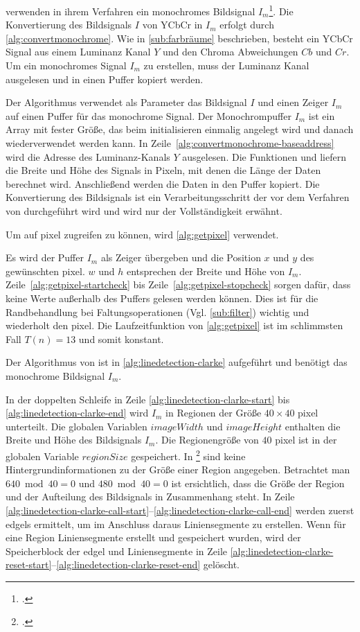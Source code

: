 \citeauthor{clarke96} verwenden in ihrem Verfahren ein monochromes Bildsignal $I_m$\footcite[Vgl.][S.~417]{clarke96}.
 Die Konvertierung des Bildsignals $I$ von YCbCr in $I_m$ erfolgt durch \autoref{alg:convertmonochrome}. Wie in
 \autoref{sub:farbräume} beschrieben, besteht ein YCbCr Signal aus einem Luminanz Kanal $Y$ und den Chroma Abweichungen
 $Cb$ und $Cr$. Um ein monochromes Signal $I_m$ zu erstellen, muss der Luminanz Kanal ausgelesen und in einen Puffer
 kopiert werden.

Der Algorithmus verwendet als Parameter das Bildsignal $I$ und einen Zeiger $I_m$ auf einen Puffer für das monochrome
 Signal. Der Monochrompuffer $I_m$ ist ein Array mit fester Größe, das beim initialisieren einmalig angelegt wird und
 danach wiederverwendet werden kann. In Zeile~\ref{alg:convertmonochrome-baseaddress} wird die Adresse des
 Luminanz-Kanals $Y$ ausgelesen. Die Funktionen  und  liefern die Breite und Höhe des
 Signals in Pixeln, mit denen die Länge der Daten berechnet wird. Anschließend werden die Daten in den Puffer kopiert.
 Die Konvertierung des Bildsignals ist ein Verarbeitungsschritt der vor dem Verfahren von \citeauthor{clarke96}
 durchgeführt wird und wird nur der Vollständigkeit erwähnt.

Um auf \gls{pixel} zugreifen zu können, wird \autoref{alg:getpixel} verwendet.

Es wird der Puffer $I_m$ als Zeiger übergeben und die Position $x$ und $y$ des gewünschten \gls{pixel}. $w$ und $h$
 entsprechen der Breite und Höhe von $I_m$. Zeile~\ref{alg:getpixel-startcheck} bis Zeile~\ref{alg:getpixel-stopcheck}
 sorgen dafür, dass keine Werte außerhalb des Puffers gelesen werden können. Dies ist für die Randbehandlung bei
 Faltungsoperationen (Vgl. \autoref{sub:filter}) wichtig und wiederholt den \gls{pixel}. Die Laufzeitfunktion von
 \autoref{alg:getpixel} ist im schlimmsten Fall $T(n) = 13$ und somit konstant.

Der Algorithmus von \citeauthor{clarke96} ist in \autoref{alg:linedetection-clarke} aufgeführt und benötigt das
 monochrome Bildsignal $I_m$.

In der doppelten Schleife in Zeile \ref{alg:linedetection-clarke-start} bis \ref{alg:linedetection-clarke-end} wird
 $I_m$ in Regionen der Größe $40 \times 40$ \gls{pixel} unterteilt. Die globalen Variablen $\mathit{imageWidth}$ und
 $\mathit{imageHeight}$ enthalten die Breite und Höhe des Bildsignals $I_m$. Die Regionengröße von $40$ \gls{pixel} ist
 in der globalen Variable $\mathit{regionSize}$ gespeichert. In \citeauthor{clarke96}\footcite{clarke96} sind keine
 Hintergrundinformationen zu der Größe einer Region angegeben. Betrachtet man $640 \bmod 40 = 0$ und $480 \bmod 40 = 0$
 ist ersichtlich, dass die Größe der Region und der Aufteilung des Bildsignals in Zusammenhang steht. In Zeile
 \ref{alg:linedetection-clarke-call-start}--\ref{alg:linedetection-clarke-call-end} werden zuerst \glspl{edgel}
 ermittelt, um im Anschluss daraus Liniensegmente zu erstellen. Wenn für eine Region Liniensegmente erstellt und
 gespeichert wurden, wird der Speicherblock der \gls{edgel} und Liniensegmente in Zeile
 \ref{alg:linedetection-clarke-reset-start}--\ref{alg:linedetection-clarke-reset-end} gelöscht.

